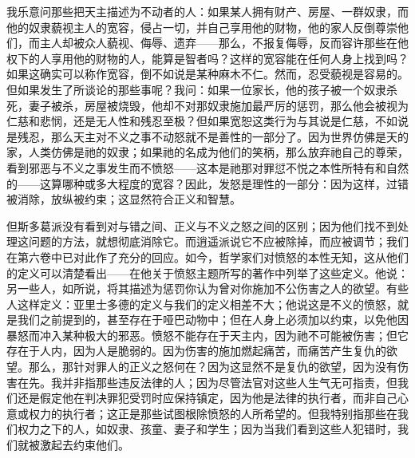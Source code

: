 我乐意问那些把天主描述为不动者的人：如果某人拥有财产、房屋、一群奴隶，而他的奴隶藐视主人的宽容，侵占一切，并自己享用他的财物，他的家人反倒尊崇他们，而主人却被众人藐视、侮辱、遗弃——那么，不报复侮辱，反而容许那些在他权下的人享用他的财物的人，能算是智者吗？\newline{}这样的宽容能在任何人身上找到吗？\newline{}如果这确实可以称作宽容，倒不如说是某种麻木不仁。\newline{}然而，忍受藐视是容易的。\newline{}但如果发生了所谈论的那些事呢？\newline{}我问：如果一位家长，他的孩子被一个奴隶杀死，妻子被杀，房屋被烧毁，他却不对那奴隶施加最严厉的惩罚，那么他会被视为仁慈和悲悯，还是无人性和残忍至极？\newline{}但如果宽恕这类行为与其说是仁慈，不如说是残忍，那么天主对不义之事不动怒就不是善性的一部分了。\newline{}因为世界仿佛是天的家，人类仿佛是祂的奴隶；如果祂的名成为他们的笑柄，那么放弃祂自己的尊荣，看到邪恶与不义之事发生而不愤怒——这本是祂那对罪愆不悦之本性所特有和自然的——这算哪种或多大程度的宽容？\newline{}因此，发怒是理性的一部分：因为这样，过错被消除，放纵被约束；这显然符合正义和智慧。\par

但斯多葛派没有看到对与错之间、正义与不义之怒之间的区别；因为他们找不到处理这问题的方法，就想彻底消除它。\newline{}而逍遥派说它不应被除掉，而应被调节；我们在第六卷中已对此作了充分的回应。\newline{}如今，哲学家们对愤怒的本性无知，这从他们的定义可以清楚看出——在他关于愤怒主题所写的著作中列举了这些定义。他说：\newline{}另一些人，如所说，将其描述为惩罚你认为曾对你施加不公伤害之人的欲望。\newline{}有些人这样定义：\newline{}亚里士多德的定义与我们的定义相差不大；他说\newline{}这是不义的愤怒，就是我们之前提到的，甚至存在于哑巴动物中；但在人身上必须加以约束，以免他因暴怒而冲入某种极大的邪恶。\newline{}愤怒不能存在于天主内，因为祂不可能被伤害；但它存在于人内，因为人是脆弱的。因为伤害的施加燃起痛苦，而痛苦产生复仇的欲望。\newline{}那么，那针对罪人的正义之怒何在？因为这显然不是复仇的欲望，因为没有伤害在先。\newline{}我并非指那些违反法律的人；因为尽管法官对这些人生气无可指责，但我们还是假定他在判决罪犯受罚时应保持镇定，因为他是法律的执行者，而非自己心意或权力的执行者；这正是那些试图根除愤怒的人所希望的。\newline{}但我特别指那些在我们权力之下的人，如奴隶、孩童、妻子和学生；因为当我们看到这些人犯错时，我们就被激起去约束他们。\par

